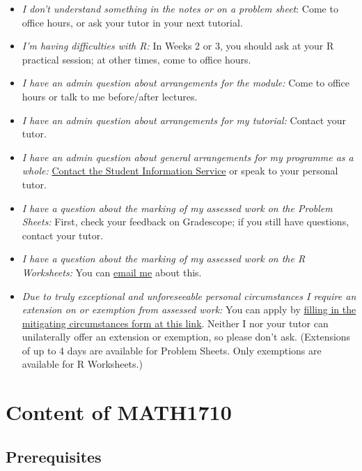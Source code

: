\documentclass[
  a4paper,
]{book}
\providecommand{\tightlist}{%
  \setlength{\itemsep}{0pt}\setlength{\parskip}{0pt}}
\theoremstyle{definition}
\theoremstyle{definition}
\theoremstyle{definition}
\theoremstyle{definition}
\theoremstyle{remark}
\begin{document}
\begin{itemize}
\tightlist
\item
  \emph{I don't understand something in the notes or on a problem sheet}: Come to office hours, or ask your tutor in your next tutorial.
\item
  \emph{I'm having difficulties with R:} In Weeks 2 or 3, you should ask at your R practical session; at other times, come to office hours.
\item
  \emph{I have an admin question about arrangements for the module:} Come to office hours or talk to me before/after lectures.
\item
  \emph{I have an admin question about arrangements for my tutorial:} Contact your tutor.
\item
  \emph{I have an admin question about general arrangements for my programme as a whole:} \href{https://students.leeds.ac.uk/askingforhelp}{Contact the Student Information Service} or speak to your personal tutor.
\item
  \emph{I have a question about the marking of my assessed work on the Problem Sheets:} First, check your feedback on Gradescope; if you still have questions, contact your tutor.
\item
  \emph{I have a question about the marking of my assessed work on the R Worksheets:} You can \href{mailto:m.aldridge@leeds.ac.uk}{email me} about this.
\item
  \emph{Due to truly exceptional and unforeseeable personal circumstances I require an extension on or exemption from assessed work:} You can apply by \href{https://students.leeds.ac.uk/info/10111/assessment/860/mitigating_circumstances}{filling in the mitigating circumstances form at this link}. Neither I nor your tutor can unilaterally offer an extension or exemption, so please don't ask. (Extensions of up to 4 days are available for Problem Sheets. Only exemptions are available for R Worksheets.)
\end{itemize}

\hypertarget{about-content}{%
\section*{Content of MATH1710}\label{about-content}}

\hypertarget{prereqs}{%
\subsection*{Prerequisites}\label{prereqs}}
\end{document}
